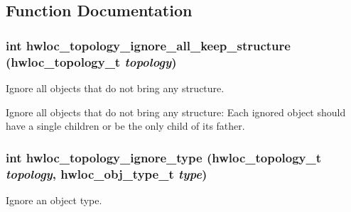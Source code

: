 \subsection{Function Documentation}
\hypertarget{group__hwlocality__configuration_g7c9cf147442d65d755c664ccde3bb3ef}{
\subsubsection[{hwloc\_\-topology\_\-ignore\_\-all\_\-keep\_\-structure}]{\setlength{\rightskip}{0pt plus 5cm}int hwloc\_\-topology\_\-ignore\_\-all\_\-keep\_\-structure ({\bf hwloc\_\-topology\_\-t} {\em topology})}}
\label{group__hwlocality__configuration_g7c9cf147442d65d755c664ccde3bb3ef}


Ignore all objects that do not bring any structure. 

Ignore all objects that do not bring any structure: Each ignored object should have a single children or be the only child of its father. \hypertarget{group__hwlocality__configuration_gfcf30842e8cb47b4c3dcaebecea31e17}{
\subsubsection[{hwloc\_\-topology\_\-ignore\_\-type}]{\setlength{\rightskip}{0pt plus 5cm}int hwloc\_\-topology\_\-ignore\_\-type ({\bf hwloc\_\-topology\_\-t} {\em topology}, \/  {\bf hwloc\_\-obj\_\-type\_\-t} {\em type})}}
\label{group__hwlocality__configuration_gfcf30842e8cb47b4c3dcaebecea31e17}


Ignore an object type. 

